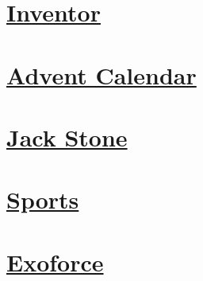 \section*{\centering \hyperref[contents]{Inventor}}\label{image:Inventor}
\begin{figure}[H]\begin{flushleft}
\end{flushleft}\end{figure}
\vspace{2.5cm}
\section*{\centering \hyperref[contents]{Advent Calendar}}\label{image:Advent Calendar}
\begin{figure}[H]\begin{flushleft}
\end{flushleft}\end{figure}
\vspace{2.5cm}
\section*{\centering \hyperref[contents]{Jack Stone}}\label{image:Jack Stone}
\begin{figure}[H]\begin{flushleft}
\end{flushleft}\end{figure}
\vspace{2.5cm}
\section*{\centering \hyperref[contents]{Sports}}\label{image:Sports}
\begin{figure}[H]\begin{flushleft}
\end{flushleft}\end{figure}
\vspace{2.5cm}
\section*{\centering \hyperref[contents]{Exoforce}}\label{image:Exoforce}
\begin{figure}[H]\begin{flushleft}
\end{flushleft}\end{figure}
\vspace{2.5cm}
